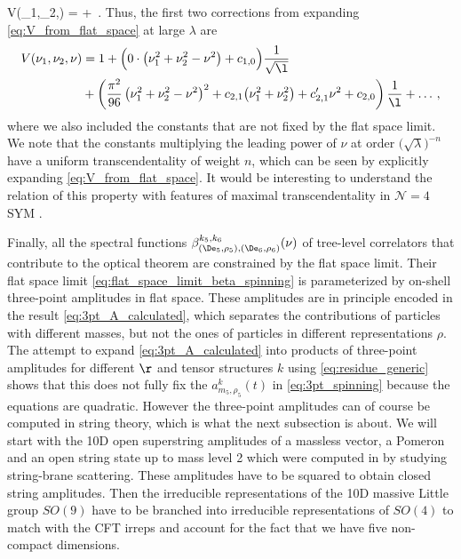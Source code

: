 	\beq
		V(\nu_1,\nu_2,\nu) = 
		+ \,.
		\label{eq:V_from_flat_space}
	\eeq
Thus, the first two corrections from expanding \eqref{eq:V_from_flat_space} at large $\lambda$ are
	\begin{align}
V(\nu_1,\nu_2,\nu) &= 1+\Big(0\cdot\big( \nu_1^2+\nu_2^2-\nu^2 \big) + c_{1,0}\Big) \frac{1}{\sqrt{\l}} 
\label{eq:V_polynomial}\\
&+\left( \frac{\pi^2}{96} \left( \nu_1^2+\nu_2^2-\nu^2 \right)^2 +c_{2,1} \big(\nu_1^2  + \nu_2^2\big)  + c'_{2,1} \nu^2 + c_{2,0} \right) \frac{1}{\l} + \ldots\,,
		\nonumber
	\end{align}
where we also included the constants  that are not fixed by the flat space limit. We note that the constants multiplying the leading power of $\nu$ at order $\big(\sqrt{\lambda}\big)^{-n}$ have a uniform transcendentality of weight $n$, which can be seen by explicitly expanding \eqref{eq:V_from_flat_space}. It would be interesting to understand the relation of this property with features of maximal transcendentality in $\mathcal{N}=4$ SYM \cite{Kotikov:2002ab,Kotikov:2007cy}.


Finally, all the spectral functions $\beta^{k_5,k_6}_{(\De_5,\rho_5),(\De_6,\rho_6)} (\nu)$ of tree-level correlators that contribute to the optical theorem are constrained 
by the flat space limit. Their flat space limit \eqref{eq:flat_space_limit_beta_spinning} is parameterized by on-shell three-point amplitudes in flat space.
These amplitudes are in principle encoded in the result \eqref{eq:3pt_A_calculated},
which separates the contributions of particles with different masses, but not the ones of particles in different representations $\rho$. 
The attempt to expand \eqref{eq:3pt_A_calculated} into products of three-point amplitudes for different $\r$ and tensor structures $k$ using \eqref{eq:residue_generic} shows that this does not fully fix the $a_{m_5,\rho_5}^{k}(t)$ in \eqref{eq:3pt_spinning} because the equations are quadratic.
However the three-point amplitudes can of course be computed in string theory, which is what the next subsection is about.
We will start with the 10D open superstring amplitudes of a massless vector, a Pomeron and an open string state up to mass level 2 which were computed in \cite{DAppollonio:2013mgj} by studying string-brane scattering. These amplitudes have to be squared to obtain closed string amplitudes. Then the irreducible representations of the 10D massive Little group $SO(9)$ have to be branched into irreducible representations of $SO(4)$ to match with the CFT irreps and account for the fact that we have five non-compact dimensions.





